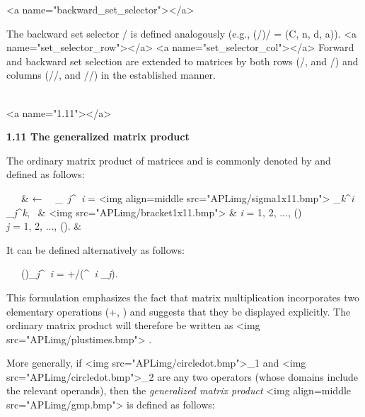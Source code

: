 <a name="backward_set_selector"></a>
\par The backward set selector \textit{\tau}/ is defined analogously (e.g., (\textit{\tau}/)/ = 
(C, n, d, a)).
<a name="set_selector_row"></a>
<a name="set_selector_col"></a> Forward and backward set selection are extended to matrices by both rows (\textit{\sigma}/, and \textit{\tau}/) and columns (\textit{\sigma}//, and \textit{\tau}//) in the established manner.
\\\ 



<a name="1.11"></a>
\par \textbf{1.11 The generalized matrix product}

\par The ordinary matrix product of matrices  and  is commonly denoted by
 and defined as follows:

\begin{tabularx}
\ \ \ & 
 ←  \ \leftrightarrow\ 
_{\textit{\ j}}^{\textit{\ i}} =
<img align=middle src="APLimg/sigma1x11.bmp"> 
_{\textit{k}}^{\textit{i}} \times
{}_{\textit{j}}^{\textit{k}}, \ & 
<img src="APLimg/bracket1x11.bmp"> & 
\textit{i} = 1, 2, ..., \textit{\mu}()\\
\textit{j} = 1, 2, ..., \textit{\nu}(). & \\
\end{tabularx}

It can be defined alternatively as follows:

\par \ \ \ ()_{\textit{j}}^{\textit{\ i}} = +/(^{\textit{\ i}} \times 
\mathbf{Y}_{\textit{j}}).


\par This formulation emphasizes the fact that matrix multiplication incorporates two elementary operations (+, \times) and suggests that they be displayed explicitly. The ordinary matrix product will therefore be written as
\mathbf{X} <img src="APLimg/plustimes.bmp"> \mathbf{Y}.

\par More generally, if <img src="APLimg/circledot.bmp">_{1} and <img src="APLimg/circledot.bmp">_{2} are any two operators (whose domains include the relevant operands), then the \textit{generalized matrix product}
<img align=middle src="APLimg/gmp.bmp"> is defined as follows:

